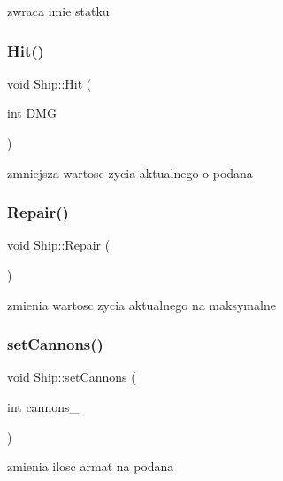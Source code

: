 zwraca imie statku 

\mbox{\label{class_ship_a13d7e59a6e96c98b342dd97473f71c38}} 
\subsubsection{\texorpdfstring{Hit()}{Hit()}}
{\footnotesize\ttfamily void Ship\+::\+Hit (\begin{DoxyParamCaption}\item[{int}]{D\+MG }\end{DoxyParamCaption})}



zmniejsza wartosc zycia aktualnego o podana 

\mbox{\label{class_ship_a1046a0f2b87a03252ffc13582880cc11}} 
\subsubsection{\texorpdfstring{Repair()}{Repair()}}
{\footnotesize\ttfamily void Ship\+::\+Repair (\begin{DoxyParamCaption}{ }\end{DoxyParamCaption})\hspace{0.3cm}{\ttfamily [inline]}}



zmienia wartosc zycia aktualnego na maksymalne 

\mbox{\label{class_ship_ab3b9f082db652dd440736dc79a4ed507}} 
\subsubsection{\texorpdfstring{set\+Cannons()}{setCannons()}}
{\footnotesize\ttfamily void Ship\+::set\+Cannons (\begin{DoxyParamCaption}\item[{int}]{cannons\+\_\+ }\end{DoxyParamCaption})\hspace{0.3cm}{\ttfamily [inline]}}



zmienia ilosc armat na podana 

\mbox{\label{class_ship_a3b79ef24977758ea65b543dd30a7b008}} 
